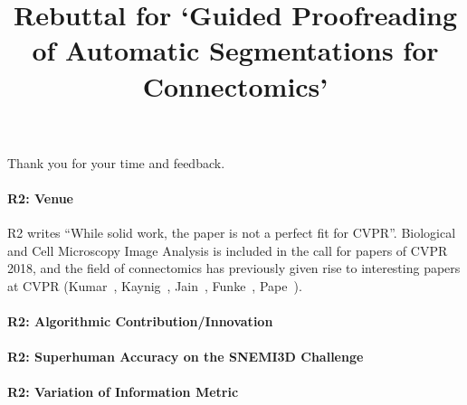 \documentclass[10pt,twocolumn,letterpaper]{article}
\begin{document}
\title{Rebuttal for `Guided Proofreading of Automatic Segmentations for Connectomics'}  %

\maketitle
\thispagestyle{empty}

Thank you for your time and feedback.

\paragraph{R2: Venue} R2 writes ``While solid work, the paper is not a perfect fit for CVPR''. Biological and Cell Microscopy Image Analysis is included in the call for papers of CVPR 2018, and the field of connectomics has previously given rise to interesting papers at CVPR (Kumar~, Kaynig~, Jain~, Funke~, Pape~). %

\paragraph{R2: Algorithmic Contribution/Innovation}

\paragraph{R2: Superhuman Accuracy on the SNEMI3D Challenge} \cite{superhuman_performance}

\paragraph{R2: Variation of Information Metric} \cite{NunezIglesias2013Machine}
\end{document}
